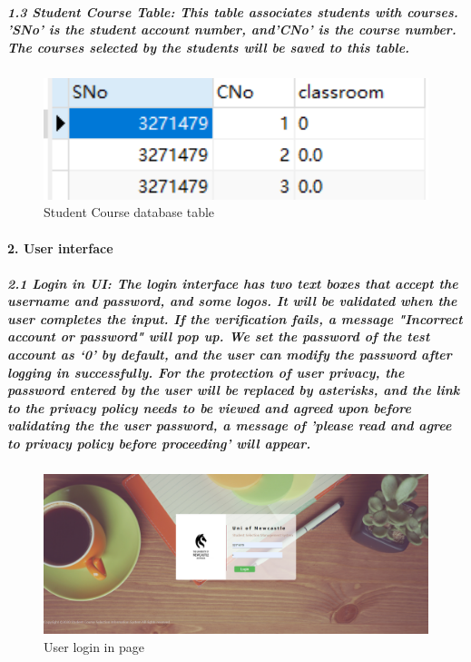 \documentclass[12pt]{article}
\begin{document}
\newpage

\subparagraph{1.3 Student Course Table: This table associates students with courses. 'SNo' is the student account number, and'CNo' is the course number. The courses selected by the students will be saved to this table.}

\begin{figure}[h]
\centering
\includegraphics[width=14cm]{./db_studentCourse.png}
Student Course database table
\end{figure}

\newpage

\paragraph{2. User interface}

\subparagraph{2.1 Login in UI: The login interface has two text boxes that accept the username and password, and some logos. It will be validated when the user completes the input. If the verification fails, a message "Incorrect account or password" will pop up. We set the password of the test account as ‘0’ by default, and the user can modify the password after logging in successfully. For the protection of user privacy, the password entered by the user will be replaced by asterisks, and the link to the privacy policy needs to be viewed and agreed upon before validating the the user password, a message of 'please read and agree to privacy policy before proceeding' will appear.}

\begin{figure}[h]
\centering
\includegraphics[width=14cm]{./UI_login.png}
User login in page
\end{figure}
\end{document}
